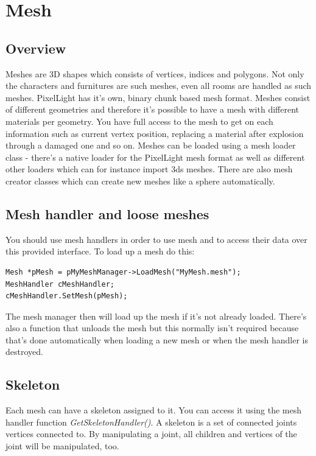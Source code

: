 \chapter{Mesh}




\section{Overview}
Meshes are 3D shapes which consists of vertices, indices and polygons. Not only the characters and furnitures are such meshes, even all rooms are handled as such meshes. PixelLight has it's own, binary chunk based mesh format. Meshes consist of different geometries and therefore it's possible to have a mesh with different materials per geometry. You have full access to the mesh to get on each information such as current vertex position, replacing a material after explosion through a damaged one and so on. Meshes can be loaded using a mesh loader class - there's a native loader for the PixelLight mesh format as well as different other loaders which can for instance import 3ds meshes. There are also mesh creator classes which can create new meshes like a sphere automatically.




\section{Mesh handler and loose meshes}
You should use mesh handlers in order to use mesh and to access their data over this provided interface. To load up a mesh do this:

\begin{lstlisting}[caption=Loading a mesh]
Mesh *pMesh = pMyMeshManager->LoadMesh("MyMesh.mesh");
MeshHandler cMeshHandler;
cMeshHandler.SetMesh(pMesh);
\end{lstlisting}

The mesh manager then will load up the mesh if it's not already loaded. There's also a function that unloads the mesh but this normally isn't required because that's done automatically when loading a new mesh or when the mesh handler is destroyed.




\section{Skeleton}
Each mesh can have a skeleton assigned to it. You can access it using the mesh handler function \emph{GetSkeletonHandler()}. A skeleton is a set of connected joints vertices connected to. By manipulating a joint, all children and vertices of the joint will be manipulated, too.

